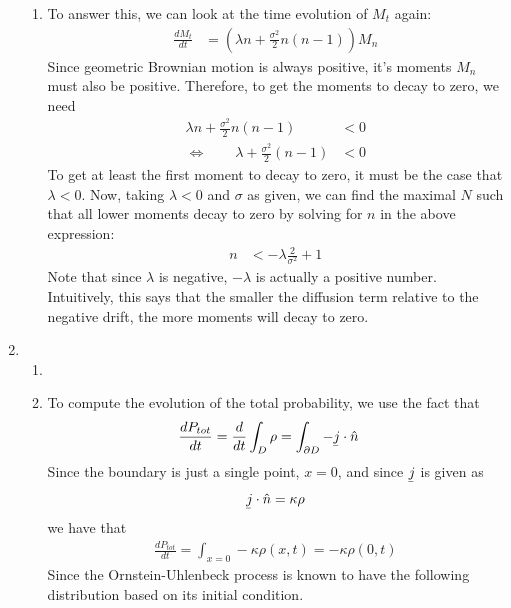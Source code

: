 \documentclass[12pt]{article}
\theoremstyle{plain}
\theoremstyle{definition}
\theoremstyle{remark}
\begin{document}
\begin{enumerate}
\begin{enumerate}
      \item %
        To answer this, we can look at the time evolution of $M_t$ again:
        \begin{align*}
          \frac{dM_t}{dt}
          &=
          \left(
          \lambda n + \frac{\sigma^2}{2}n(n-1)
          \right)M_n
        \end{align*}
        Since geometric Brownian motion is always positive, it's moments
        $M_n$ must also be positive. Therefore, to get the moments to
        decay to zero, we need
        \begin{align*}
          \lambda n + \frac{\sigma^2}{2}n(n-1)
          &< 0 \\
          \Leftrightarrow\qquad
          \lambda + \frac{\sigma^2}{2}(n-1)
          &< 0
        \end{align*}
        To get at least the first moment to decay to zero, it must be
        the case that $\lambda<0$. Now, taking $\lambda<0$ and
        $\sigma$ as given, we can find the maximal $N$ such that all
        lower moments decay to zero by solving for $n$ in the above
        expression:
        \begin{align*}
          n &< -\lambda \frac{2}{\sigma^2}+ 1
        \end{align*}
        Note that since $\lambda$ is negative, $-\lambda$ is actually a
        positive number.  Intuitively, this says that the smaller the
        diffusion term relative to the negative drift, the more moments
        will decay to zero.
    \end{enumerate}

  \item %
    \begin{enumerate}
      \item %

      \item %
        To compute the evolution of the total probability, we use the
        fact that
        \begin{align*}
          \frac{dP_{tot}}{dt}
          =
          \frac{d}{dt}
          \int_D \rho
          &= \int_{\partial D} -\underaccent{\bar}{j}\cdot \hat{n}
        \end{align*}
        Since the boundary is just a single point, $x=0$, and since
        $\underaccent{\bar}{j}$ is given as
        \begin{align*}
          \underaccent{\bar}{j}\cdot \hat{n} = \kappa \rho
        \end{align*}
        we have that
        \begin{align*}
          \frac{dP_{tot}}{dt}
          = \int_{x=0}
          - \kappa \rho(x,t)
          =
          - \kappa \rho(0,t)
        \end{align*}
        Since the Ornstein-Uhlenbeck process is known to have the
        following distribution based on its initial condition.


\end{enumerate}
\end{enumerate}
\end{document}
